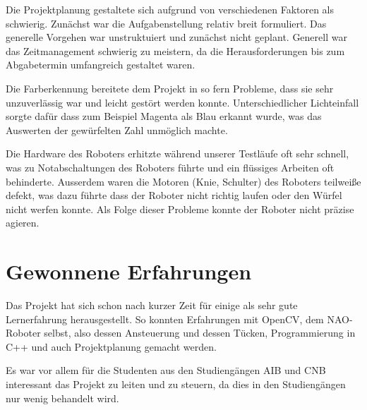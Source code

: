         Die Projektplanung gestaltete sich aufgrund von verschiedenen Faktoren
        als schwierig.
        Zunächst war die Aufgabenstellung relativ breit formuliert.
        Das generelle Vorgehen war unstruktuiert und zunächst nicht geplant.
        Generell war das Zeitmanagement schwierig zu meistern, da die
        Herausforderungen bis zum Abgabetermin umfangreich gestaltet waren.

        Die Farberkennung bereitete dem Projekt in so fern Probleme, dass sie
        sehr unzuverlässig war und leicht gestört werden konnte.
        Unterschiedlicher Lichteinfall sorgte dafür dass zum Beispiel Magenta
        als Blau erkannt wurde, was das Auswerten der gewürfelten Zahl unmöglich
        machte.

        Die Hardware des Roboters erhitzte während unserer Testläufe oft sehr
        schnell, was zu Notabschaltungen des Roboters führte und ein flüssiges
        Arbeiten oft behinderte.
        Ausserdem waren die Motoren (Knie, Schulter) des Roboters teilweiße
        defekt, was dazu führte dass der Roboter nicht richtig laufen oder den
        Würfel nicht werfen konnte.
        Als Folge dieser Probleme konnte der Roboter nicht präzise agieren.

    \section{Gewonnene Erfahrungen}

        Das Projekt hat sich schon nach kurzer Zeit für einige als sehr gute
        Lernerfahrung herausgestellt.
        So konnten Erfahrungen mit OpenCV, dem NAO-Roboter selbst, also dessen
        Ansteuerung und dessen Tücken, Programmierung in C++ und auch
        Projektplanung gemacht werden.

        Es war vor allem für die Studenten aus den Studiengängen AIB und CNB
        interessant das Projekt zu leiten und zu steuern, da dies in den
        Studiengängen nur wenig behandelt wird.

